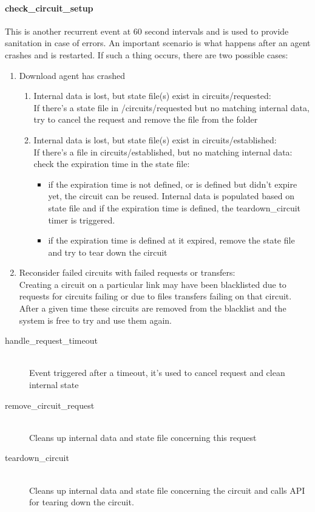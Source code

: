 \paragraph{check\_circuit\_setup}

This is another recurrent event at 60 second intervals and is used to provide
sanitation in case of errors. An important scenario is what happens after an
agent crashes and is restarted. If such a thing occurs, there are two possible
cases:

\begin{enumerate}
  \item Download agent has crashed
  \begin{enumerate}
    \item Internal data is lost, but state file(s) exist in circuits/requested:\\
			If there's a state file in /circuits/requested but no matching internal data, 
			try to cancel the request and remove the file from the folder
    \item Internal data is lost, but state file(s) exist in circuits/established:\\
			If there's a file in circuits/established, but no matching internal data:
			check the expiration time in the state file:
			\begin{itemize}
			  \item if the expiration time is not defined, or is defined but didn't expire yet,
					  the circuit can be reused. Internal data is populated based on state
					 file and if the expiration time is defined, the teardown\_circuit timer is
					 triggered.
			  \item if the expiration time is defined at it expired, remove the state file and
					 try to tear down the circuit 
			\end{itemize}
  \end{enumerate}
  \item Reconsider failed circuits with failed requests or transfers:\\
		  Creating a circuit on a particular link may have been blacklisted due to requests
		  for circuits failing or due to files transfers failing on that circuit. After a given
		  time these circuits are removed from the blacklist and the system is free to try
		  and use them again.
\end{enumerate}

\begin{description}
	\item[handle\_request\_timeout] \hfill \\
		Event triggered after a timeout, it's used to cancel request and clean internal state
	\item[remove\_circuit\_request] \hfill \\
		Cleans up internal data and state file concerning this request
	\item[teardown\_circuit] \hfill \\
		Cleans up internal data and state file concerning the circuit and calls API for 
		tearing down the circuit.
\end{description}

